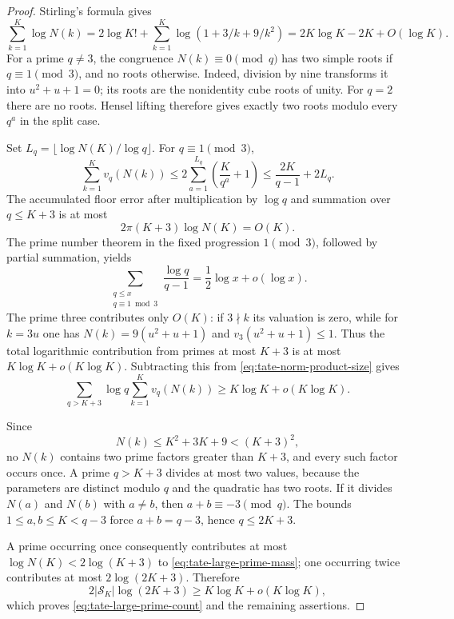 \documentclass[11pt]{article}
\theoremstyle{definition}
\theoremstyle{remark}
\begin{document}
\begin{proof}
Stirling's formula gives
\begin{equation}\label{eq:tate-norm-product-size}
 \sum_{k=1}^K\log N(k)
 =2\log K!+\sum_{k=1}^K\log(1+3/k+9/k^2)
 =2K\log K-2K+O(\log K).
\end{equation}
For a prime $q\ne3$, the congruence $N(k)\equiv0\pmod q$
has two simple roots if $q\equiv1\pmod3$, and no roots
otherwise.  Indeed, division by nine transforms it into
$u^2+u+1=0$; its roots are the nonidentity cube roots of unity.
For $q=2$ there are no roots.  Hensel lifting therefore gives
exactly two roots modulo every $q^a$ in the split case.

Set $L_q=\lfloor\log N(K)/\log q\rfloor$.  For
$q\equiv1\pmod3$,
\begin{equation}\label{eq:tate-small-prime-valuation}
 \sum_{k=1}^K v_q(N(k))
 \le2\sum_{a=1}^{L_q}\left(\frac K{q^a}+1\right)
 \le\frac{2K}{q-1}+2L_q.
\end{equation}
The accumulated floor error after multiplication by $\log q$
and summation over $q\le K+3$ is at most
\[
 2\pi(K+3)\log N(K)=O(K).
\]
The prime number theorem in the fixed progression $1\pmod3$,
followed by partial summation, yields
\[
 \sum_{\substack{q\le x\\q\equiv1\bmod3}}
                  \frac{\log q}{q-1}
 =\frac12\log x+o(\log x).
\]
The prime three contributes only $O(K)$: if $3\nmid k$ its
valuation is zero, while for $k=3u$ one has
$N(k)=9(u^2+u+1)$ and $v_3(u^2+u+1)\le1$.
Thus the total logarithmic contribution from primes at most
$K+3$ is at most $K\log K+o(K\log K)$.  Subtracting this
from \eqref{eq:tate-norm-product-size} gives
\begin{equation}\label{eq:tate-large-prime-mass}
 \sum_{q>K+3}\log q\sum_{k=1}^K v_q(N(k))
 \ge K\log K+o(K\log K).
\end{equation}

Since
\[
 N(k)\le K^2+3K+9<(K+3)^2,
\]
no $N(k)$ contains two prime factors greater than $K+3$,
and every such factor occurs once.  A prime $q>K+3$ divides
at most two values, because the parameters are distinct modulo
$q$ and the quadratic has two roots.  If it divides $N(a)$
and $N(b)$ with $a\ne b$, then
$a+b\equiv-3\pmod q$.  The bounds $1\le a,b\le K<q-3$
force $a+b=q-3$, hence $q\le2K+3$.

A prime occurring once consequently contributes at most
$\log N(K)<2\log(K+3)$ to
\eqref{eq:tate-large-prime-mass}; one occurring twice contributes
at most $2\log(2K+3)$.  Therefore
\[
 2|\mathcal S_K|\log(2K+3)
 \ge K\log K+o(K\log K),
\]
which proves \eqref{eq:tate-large-prime-count} and the remaining
assertions.
\end{proof}
\end{document}
